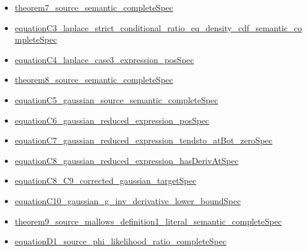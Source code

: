 \documentclass[10pt]{article}
\begin{document}
\begin{itemize}[leftmargin=1.2em]
\begin{itemize}[leftmargin=1.2em]
\item \hyperlink{source-claim-aceb5e75cb75d8b8}{theorem7\_\allowbreak{}source\_\allowbreak{}semantic\_\allowbreak{}complete\allowbreak{}Spec}
\item \hyperlink{source-claim-fb611bb534f07b11}{equation\allowbreak{}C3\_\allowbreak{}laplace\_\allowbreak{}strict\_\allowbreak{}conditional\_\allowbreak{}ratio\_\allowbreak{}eq\_\allowbreak{}density\_\allowbreak{}cdf\_\allowbreak{}semantic\_\allowbreak{}complete\allowbreak{}Spec}
\item \hyperlink{source-claim-29d2b7baa5996f3d}{equation\allowbreak{}C4\_\allowbreak{}laplace\_\allowbreak{}case3\_\allowbreak{}expression\_\allowbreak{}pos\allowbreak{}Spec}
\item \hyperlink{source-claim-33bdbb546218e99a}{theorem8\_\allowbreak{}source\_\allowbreak{}semantic\_\allowbreak{}complete\allowbreak{}Spec}
\item \hyperlink{source-claim-43364c7dea10aac0}{equation\allowbreak{}C5\_\allowbreak{}gaussian\_\allowbreak{}source\_\allowbreak{}semantic\_\allowbreak{}complete\allowbreak{}Spec}
\item \hyperlink{source-claim-c25f59d1a0e8be35}{equation\allowbreak{}C6\_\allowbreak{}gaussian\_\allowbreak{}reduced\_\allowbreak{}expression\_\allowbreak{}pos\allowbreak{}Spec}
\item \hyperlink{source-claim-4d39c9a7a45156fa}{equation\allowbreak{}C7\_\allowbreak{}gaussian\_\allowbreak{}reduced\_\allowbreak{}expression\_\allowbreak{}tendsto\_\allowbreak{}at\allowbreak{}Bot\_\allowbreak{}zero\allowbreak{}Spec}
\item \hyperlink{source-claim-2c9d403cd319b538}{equation\allowbreak{}C8\_\allowbreak{}gaussian\_\allowbreak{}reduced\_\allowbreak{}expression\_\allowbreak{}has\allowbreak{}Deriv\allowbreak{}At\allowbreak{}Spec}
\item \hyperlink{source-claim-4139a609895b0de6}{equation\allowbreak{}C8\_\allowbreak{}C9\_\allowbreak{}corrected\_\allowbreak{}gaussian\_\allowbreak{}target\allowbreak{}Spec}
\item \hyperlink{source-claim-7a440699a84fb997}{equation\allowbreak{}C10\_\allowbreak{}gaussian\_\allowbreak{}g\_\allowbreak{}inv\_\allowbreak{}derivative\_\allowbreak{}lower\_\allowbreak{}bound\allowbreak{}Spec}
\item \hyperlink{source-claim-d732fbc16f2ecdeb}{theorem9\_\allowbreak{}source\_\allowbreak{}mallows\_\allowbreak{}definition1\_\allowbreak{}literal\_\allowbreak{}semantic\_\allowbreak{}complete\allowbreak{}Spec}
\item \hyperlink{source-claim-7751231944a77b74}{equation\allowbreak{}D1\_\allowbreak{}source\_\allowbreak{}phi\_\allowbreak{}likelihood\_\allowbreak{}ratio\_\allowbreak{}complete\allowbreak{}Spec}

\end{itemize}
\end{itemize}
\end{document}
